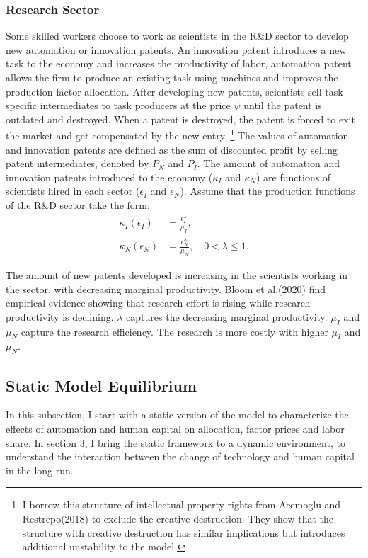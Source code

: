 \documentclass[12pt]{article}
\begin{document}
\subsubsection*{Research Sector}
Some skilled workers choose to work as scientists in the R\&D sector to develop new automation or innovation patents. An innovation patent introduces a new task to the economy and increases the productivity of labor, automation patent allows the firm to produce an existing task using machines and improves the production factor allocation. After developing new patents, scientists sell task-specific intermediates to task producers at the price $\psi$ until the patent is outdated and destroyed. When a patent is destroyed, the patent is forced to exit the market and get compensated by the new entry. \footnote{I borrow this structure of intellectual property rights from Acemoglu and Restrepo(2018)\nocite{AcemogluRestrepo2018} to exclude the creative destruction. They show that the structure with creative destruction has similar implications but introduces additional unstability to the model.} The values of automation and innovation patents are defined as the sum of discounted profit by selling patent intermediates, denoted by $P_N$ and $P_I$. The amount of automation and innovation patents introduced to the economy ($\kappa_I$ and $\kappa_N$) are functions of scientists hired in each sector ($\epsilon_I$ and $\epsilon_N$).
Assume that the production functions of the R\&D sector take the form: 
\begin{align}
\label{kappa_I}
\kappa_I(\epsilon_I) &= \frac{\epsilon_I^\lambda}{\mu_I}, \\
\label{kappa_N}
\kappa_N(\epsilon_N) &= \frac{\epsilon_N^\lambda}{\mu_N}, \quad 0<\lambda\leq 1.
\end{align}

The amount of new patents developed is increasing in the scientists working in the sector, with decreasing marginal productivity. Bloom et al.(2020)\nocite{Bloometal2020} find empirical evidence showing that research effort is rising while research productivity is declining. $\lambda$ captures the decreasing marginal productivity. $\mu_I$ and $\mu_N$ capture the research efficiency. The research is more costly with higher $\mu_I$ and $\mu_N$. 

\subsection{Static Model Equilibrium}
In this subsection, I start with a static version of the model to characterize the effects of automation and human capital on allocation, factor prices and labor share. In section 3, I bring the static framework to a dynamic environment, to understand the interaction between the change of technology and human capital in the long-run. 
\end{document}
